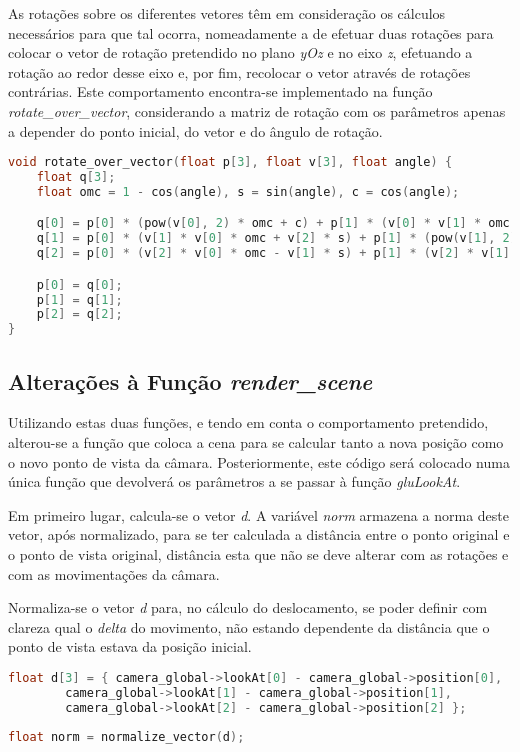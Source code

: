 \documentclass[14pt, a4 paper]{report}
\begin{document}
As rotações sobre os diferentes vetores têm em consideração os cálculos necessários para que tal ocorra, nomeadamente a de efetuar duas rotações para colocar o vetor de rotação pretendido no plano \textit{yOz} e no eixo \textit{z}, efetuando a rotação ao redor desse eixo e, por fim, recolocar o vetor através de rotações contrárias. Este comportamento encontra-se implementado na função \textit{rotate\_over\_vector}, considerando a matriz de rotação com os parâmetros apenas a depender do ponto inicial, do vetor e do ângulo de rotação.

\begin{lstlisting}[language = c++]
void rotate_over_vector(float p[3], float v[3], float angle) {
	float q[3];
	float omc = 1 - cos(angle), s = sin(angle), c = cos(angle);

	q[0] = p[0] * (pow(v[0], 2) * omc + c) + p[1] * (v[0] * v[1] * omc - v[2] * s) + p[2] * (v[0] * v[2] * omc + v[1] * s);
	q[1] = p[0] * (v[1] * v[0] * omc + v[2] * s) + p[1] * (pow(v[1], 2) * omc + c) + p[2] * (v[1] * v[2] * omc - v[0] * s);
	q[2] = p[0] * (v[2] * v[0] * omc - v[1] * s) + p[1] * (v[2] * v[1] * omc + v[0] * s) + p[2] * (pow(v[2], 2) * omc + c);

	p[0] = q[0];
	p[1] = q[1];
	p[2] = q[2];
}
\end{lstlisting}

\subsection{Alterações à Função \textit{render\_scene}}

Utilizando estas duas funções, e tendo em conta o comportamento pretendido, alterou-se a função que coloca a cena para se calcular tanto a nova posição como o novo ponto de vista da câmara. Posteriormente, este código será colocado numa única função que devolverá os parâmetros a se passar à função \textit{gluLookAt}.

Em primeiro lugar, calcula-se o vetor \textit{d}. A variável \textit{norm} armazena a norma deste vetor, após normalizado, para se ter calculada a distância entre o ponto original e o ponto de vista original, distância esta que não se deve alterar com as rotações e com as movimentações da câmara. 

Normaliza-se o vetor \textit{d} para, no cálculo do deslocamento, se poder definir com clareza qual o \textit{delta} do movimento, não estando dependente da distância que o ponto de vista estava da posição inicial.

\begin{lstlisting}[language = c++]
float d[3] = { camera_global->lookAt[0] - camera_global->position[0],
		camera_global->lookAt[1] - camera_global->position[1],
		camera_global->lookAt[2] - camera_global->position[2] };
	
float norm = normalize_vector(d);
\end{lstlisting}
\end{document}
